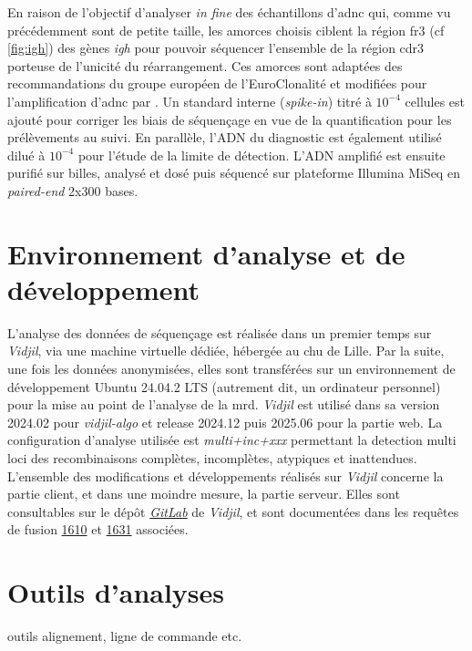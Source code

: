 En raison de l'objectif d'analyser \textit{in fine} des échantillons d'\gls{adnc} qui, comme vu précédemment sont de petite taille, 
les amorces choisis ciblent la région \gls{fr}3 (cf \autoref{fig:igh}) des gènes \textit{\gls{igh}} pour pouvoir séquencer l'ensemble de la 
région \gls{cdr}3 porteuse de l'unicité du réarrangement. 
Ces amorces sont adaptées des recommandations du groupe européen de l'EuroClonalité \cite{langerakEuroClonalityBIOMED2Guidelines2012} 
et modifiées pour l'amplification d'\gls{adnc} par \citeauthor{pottCfDNABasedNGSIG2022a} \cite{pottCfDNABasedNGSIG2022a}.
Un standard interne (\textit{spike-in}) titré à $10^{-4}$ cellules est ajouté pour corriger les biais de séquençage en vue de la quantification 
pour les prélèvements au suivi. En parallèle, l'ADN du diagnostic est également utilisé dilué à $10^{-4}$ pour l'étude de la limite de détection. 
L'ADN amplifié est ensuite purifié sur billes, analysé et dosé puis séquencé sur plateforme Illumina MiSeq en \textit{paired-end} 2x300 bases.

\section{Environnement d'analyse et de développement}

L'analyse des données de séquençage est réalisée dans un premier temps sur \textit{Vidjil}, via une machine virtuelle dédiée,
hébergée au \gls{chu} de Lille. Par la suite, une fois les données anonymisées, elles sont transférées sur un environnement de 
développement Ubuntu 24.04.2 LTS (autrement dit, un ordinateur personnel) pour la mise au point de l'analyse de la \gls{mrd}.
\textit{Vidjil} est utilisé dans sa version 2024.02 pour \textit{vidjil-algo} et release 2024.12 puis 2025.06 pour la partie 
web. La configuration d'analyse utilisée est \textit{multi+inc+xxx} permettant la detection multi loci des recombinaisons complètes, 
incomplètes, atypiques et inattendues.
L'ensemble des modifications et développements réalisés sur \textit{Vidjil} concerne la partie client, et dans une moindre mesure,
la partie serveur. Elles sont consultables sur le dépôt \href{https://gitlab.inria.fr/users/x-benha/activity}{\textit{GitLab}}
de \textit{Vidjil}, et sont documentées dans les requêtes de fusion \href{https://gitlab.inria.fr/vidjil/vidjil/-/merge_requests/1610}{1610}
et \href{https://gitlab.inria.fr/vidjil/vidjil/-/merge_requests/1631}{1631} associées.

\section{Outils d'analyses}

outils alignement, ligne de commande etc.


